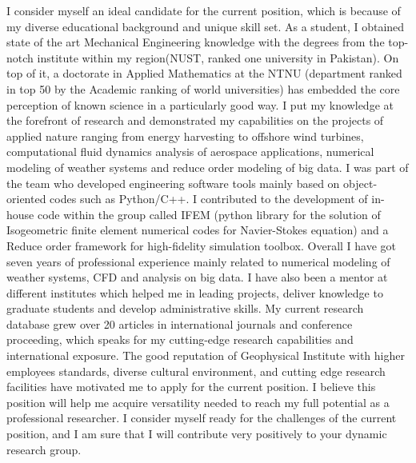 \documentclass[11pt, a4paper]{awesome-cv}
\begin{document}
\begin{cvletter}
	I consider myself an ideal candidate for the current position, which is because of my diverse educational background and unique skill set. As a student, I obtained state of the art Mechanical Engineering knowledge with the degrees from the top-notch institute within my region(NUST, ranked one university in Pakistan). On top of it, a doctorate in Applied Mathematics at the NTNU (department ranked in top 50 by the Academic ranking of world universities) has embedded the core perception of known science in a particularly good way. I put my knowledge at the forefront of research and demonstrated my capabilities on the projects of applied nature ranging from energy harvesting to offshore wind turbines, computational fluid dynamics analysis of aerospace applications, numerical modeling of weather systems and reduce order modeling of big data. I was part of the team who developed engineering software tools mainly based on object-oriented codes such as Python/C++.  I contributed to the development of in-house code within the group called IFEM (python library for the solution of Isogeometric finite element numerical codes for Navier-Stokes equation) and a Reduce order framework for high-fidelity simulation toolbox.
	Overall I have got seven years of professional experience mainly related to numerical modeling of weather systems, CFD and analysis on big data. I have also been a mentor at different institutes which helped me in leading projects, deliver knowledge to graduate students and develop administrative skills. My current research database grew over 20  articles in international journals and conference proceeding, which speaks for my cutting-edge research capabilities and international exposure.
		The good reputation of Geophysical Institute with higher employees standards, diverse cultural environment, and cutting edge research facilities have motivated me to apply for the current position. I believe this position will help me acquire versatility needed to reach my full potential as a professional researcher. I consider myself ready for the challenges of the current position, and I am sure that I will contribute very positively to your dynamic research group.
	\end{cvletter}
	
	
	\makeletterclosing
	
\end{document}
